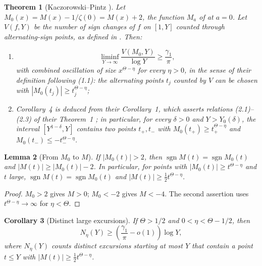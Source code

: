 \documentclass[11pt]{amsart}
\numberwithin{equation}{section}
\theoremstyle{plain}
\newtheorem{theorem}{Theorem}[section]
\newtheorem{lemma}[theorem]{Lemma}
\newtheorem{corollary}[theorem]{Corollary}
\theoremstyle{definition}
\theoremstyle{remark}
\DeclareMathOperator{\sgn}{sgn}
\begin{document}
\begin{theorem}[Kaczorowski--Pintz {\cite{KP86}}]
\label{thm:KP-quoted}
Let $M_0(x)=M(x)-1/\zeta(0)=M(x)+2$, the function $M_a$ of \cite{KP86} at
$a=0$. Let $V(f,Y)$ be the number of sign changes of $f$ on $[1,Y]$
counted through alternating-sign points, as defined in \cite{KP86}. Then:
\begin{enumerate}[label=\textup{(\roman*)}]
\item \cite[Corollary~4, p.~178, (2.13)--(2.15)]{KP86}
\begin{equation}
\label{eq:KP-signchanges}
\liminf_{Y\to\infty}\frac{V(M_0,Y)}{\log Y}\ge\frac{\gamma_1}{\pi},
\end{equation}
with combined oscillation of size $x^{\Theta-\eta}$ for every $\eta>0$, in
the sense of their definition following (1.1): the alternating points $t_j$
counted by $V$ can be chosen with $|M_0(t_j)|\ge t_j^{\Theta-\eta}$;
\item Corollary~4 is deduced from their Corollary~1, which asserts relations
(2.1)--(2.3) of their Theorem~1 \cite[pp.~175--176]{KP86}; in particular,
for every $\delta>0$ and $Y>Y_0(\delta)$, the interval $[Y^{1-\delta},Y]$
contains two points $t_+,t_-$ with
$M_0(t_+)\ge t_+^{\Theta-\eta}$ and $M_0(t_-)\le-t_-^{\Theta-\eta}$.
\end{enumerate}
\end{theorem}

\begin{lemma}[From $M_0$ to $M$]
\label{lem:KP-translation}
If $|M_0(t)|>2$, then $\sgn M(t)=\sgn M_0(t)$ and
$|M(t)|\ge|M_0(t)|-2$. In particular, for points with
$|M_0(t)|\ge t^{\Theta-\eta}$ and $t$ large,
$\sgn M(t)=\sgn M_0(t)$ and $|M(t)|\ge\frac12t^{\Theta-\eta}$.
\end{lemma}

\begin{proof}
$M_0>2$ gives $M>0$; $M_0<-2$ gives $M<-4$. The second assertion uses
$t^{\Theta-\eta}\to\infty$ for $\eta<\Theta$.
\end{proof}

\begin{corollary}[Distinct large excursions]
\label{cor:KP-large-excursions}
\label{thm:KP-M}
If $\Theta>1/2$ and $0<\eta<\Theta-1/2$, then
\begin{equation}
\label{eq:KP-large-excursions}
N_\eta(Y)\ge\left(\frac{\gamma_1}{\pi}-o(1)\right)\log Y,
\end{equation}
where $N_\eta(Y)$ counts distinct excursions starting at most $Y$ that
contain a point $t\le Y$ with $|M(t)|\ge\tfrac12 t^{\Theta-\eta}$.
\end{corollary}
\end{document}
